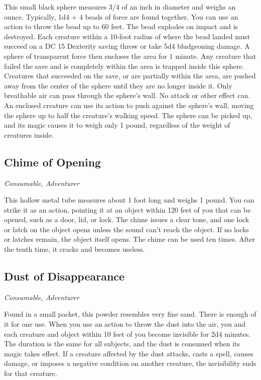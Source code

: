 This small black sphere measures 3/4 of an inch in diameter and weighs an ounce. Typically, 1d4 + 4 beads of force are found together.  You can use an action to throw the bead up to 60 feet. The bead explodes on impact and is destroyed. Each creature within a 10-foot radius of where the bead landed must succeed on a DC 15 Dexterity saving throw or take 5d4 bludgeoning damage. A sphere of transparent force then encloses the area for 1 minute. Any creature that failed the save and is completely within the area is trapped inside this sphere. Creatures that succeeded on the save, or are partially within the area, are pushed away from the center of the sphere until they are no longer inside it. Only breathable air can pass through the sphere's wall. No attack or other effect can. An enclosed creature can use its action to push against the sphere's wall, moving the sphere up to half the creature's walking speed. The sphere can be picked up, and its magic causes it to weigh only 1 pound, regardless of the weight of creatures inside.

\subsection{Chime of Opening}
\textit{Consumable, Adventurer}

This hollow metal tube measures about 1 foot long and weighs 1 pound. You can strike it as an action, pointing it at an object within 120 feet of you that can be opened, such as a door, lid, or lock. The chime issues a clear tone, and one lock or latch on the object opens unless the sound can't reach the object. If no locks or latches remain, the object itself opens. The chime can be used ten times. After the tenth time, it cracks and becomes useless.

\subsection{Dust of Disappearance}
\textit{Consumable, Adventurer}

Found in a small packet, this powder resembles very fine sand. There is enough of it for one use. When you use an action to throw the dust into the air, you and each creature and object within 10 feet of you become invisible for 2d4 minutes. The duration is the same for all subjects, and the dust is consumed when its magic takes effect. If a creature affected by the dust attacks, casts a spell, causes damage, or imposes a negative condition on another creature, the invisibility ends for that creature.

